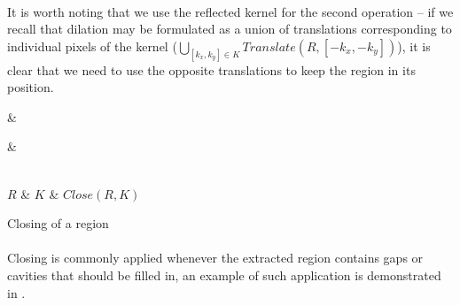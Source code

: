 \paragraph*{}
It is worth noting that we use the reflected kernel for the second operation -- if we recall that dilation may be formulated as a union of translations corresponding to individual pixels of the kernel ($\bigcup_{[k_x, k_y] \in K} Translate(R, [-k_x, -k_y])$), it is clear that we need to use the opposite translations to keep the region in its position.

\newarray\closingInput
{}

\newarray\closingKernel
{}

\newarray\closingResult
{}

\begin{table}[h]
\centering
{}

 &
 &

\\

$R$ &
$K$ &
$Close(R,K)$

\endtabular
\caption{Closing of a region}
\label{tab:RegionClosing}
\end{table}

\paragraph*{}
Closing is commonly applied whenever the extracted region contains gaps or cavities that should be filled in, an example of such application is demonstrated in .


